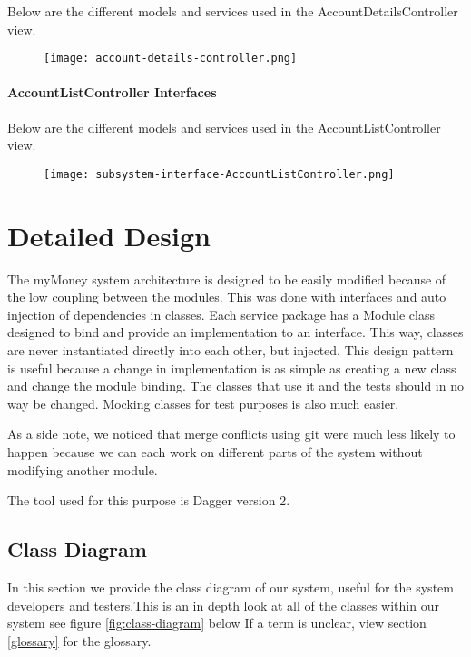 \documentclass[12pt]{article}
\begin{document}
Below are the different models and services used in the AccountDetailsController view.

\begin{figure}[H]
\texttt{[image: account-details-controller.png]}
\end{figure}

\clearpage

\paragraph{AccountListController Interfaces}

Below are the different models and services used in the AccountListController view.

\begin{figure}[H]
\texttt{[image: subsystem-interface-AccountListController.png]}
\end{figure}

\clearpage

\section{Detailed Design} \label{sec:detail}

The myMoney system architecture is designed to be easily modified because of the low coupling between the modules. This was done with interfaces and auto injection of dependencies in classes. Each service package has a Module class designed to bind and provide an implementation to an interface. This way, classes are never instantiated directly into each other, but injected. This design pattern is useful because a change in implementation is as simple as creating a new class and change the module binding. The classes that use it and the tests should in no way be changed. Mocking classes for test purposes is also much easier.

As a side note, we noticed that merge conflicts using git were much less likely to happen because we can each work on different parts of the system without modifying another module.

The tool used for this purpose is Dagger version 2.

\subsection{Class Diagram}

In this section we provide the class diagram of our system, useful for the system developers and testers.This is an in depth look at all of the classes within our system see figure \ref{fig:class-diagram} below If a term is unclear, view section \ref{glossary} for the glossary.
\end{document}
